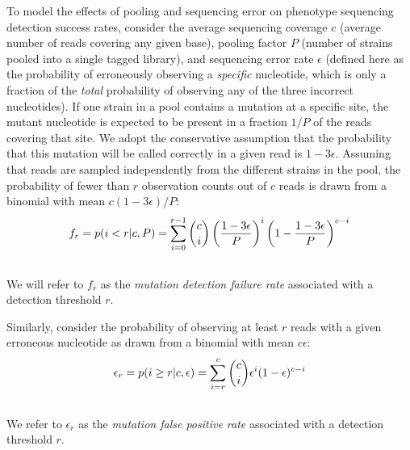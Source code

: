\documentclass[letterpaper,10pt,english]{howto}
\begin{document}
To model the effects of pooling and sequencing error on phenotype
sequencing detection success rates, consider the average sequencing
coverage $c$ (average number of reads covering any given base),
pooling factor $P$ (number of strains pooled into a single
tagged library), and sequencing error rate $\epsilon$
(defined here as the probability of erroneously
observing a \emph{specific} nucleotide, which is only a fraction of the
\emph{total} probability of observing any of the three incorrect
nucleotides).  If one strain in a pool contains a mutation
at a specific site, the mutant nucleotide is expected to be
present in a fraction $1/P$ of the reads covering that site.
We adopt the conservative assumption that the probability that
this mutation will be called correctly in a given read is
$1-3\epsilon$.
Assuming that reads are sampled independently from the different
strains in the pool, the probability of fewer than $r$
observation counts out of $c$ reads is drawn from a binomial with
mean $c(1-3\epsilon)/P$:
\begin{gather}
\begin{split}f_r = p(i < r|c, P) = \sum_{i=0}^{r-1}{{c \choose i}
\left(\frac{1-3\epsilon}{P}\right)^i
\left(1-\frac{1-3\epsilon}{P}\right)^{c-i}}\end{split}\notag\\\begin{split}\end{split}\notag
\end{gather}
We will refer to $f_r$ as the \emph{mutation detection failure rate}
associated with a detection threshold $r$.

Similarly, consider the probability of observing at least $r$
reads with a given erroneous nucleotide as drawn from a binomial
with mean $c\epsilon$:
\begin{gather}
\begin{split}\epsilon_r = p(i \ge r|c, \epsilon) = \sum_{i=r}^c{{c \choose i}
\epsilon^i(1-\epsilon)^{c-i}}\end{split}\notag\\\begin{split}\end{split}\notag
\end{gather}
We refer to $\epsilon_r$ as the \emph{mutation false positive rate}
associated with a detection threshold $r$.
\end{document}
